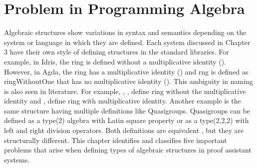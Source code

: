 \chapter{Problem in Programming Algebra}
Algebraic structures show variations in syntax and semantics depending on the
system or language in which they are defined. Each system discussed in Chapter 3
have their own style of defining structures in the standard libraries. For
example, in Idris, the ring is defined without a multiplicative identity
().
However, in Agda, the ring has a multiplicative identity
()
and rng is defined as ringWithoutOne that has no multiplicative identity
().
This ambiguity in naming is also seen in literature. For example,
\cite{anh1987morita}, \cite{jacobson1956structure},
\cite{persson1999application} define ring without the multiplicative identity
and \cite{lehmann1977algebraic}, \cite{geuvers2002constructive} define ring with
multiplicative identity. Another example is the same structure having multiple
definitions like Quasigroups. Quasigroups can be defined as a type(2) algebra
with Latin square property or as a type(2,2,2) with left and right division
operators. Both definitions are equivalent \cite{shcherbacov2003elements}, but
they are structurally different. This chapter identifies and classifies five
important problems that arise when defining types of algebraic structures in
proof assistant systems.

